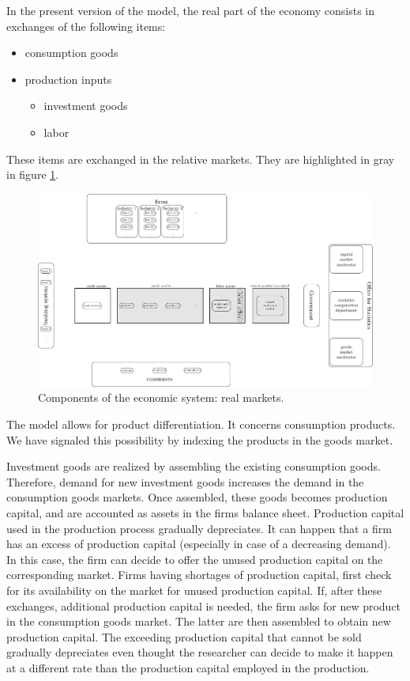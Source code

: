 \documentclass{book}
\begin{document}
In the present version of the model, the real part of the economy consists in exchanges of the following items:
\begin{itemize}
	\item consumption goods
	\item production inputs
		\begin{itemize}
			\item investment goods
			\item labor
		\end{itemize}
\end{itemize}

These items are exchanged in the relative markets. They are highlighted in gray in figure \ref{fig:componentsc2}.


\begin{figure}[htp]
\hskip-1cm\includegraphics[scale=0.5]{agents_and_interactions_figure1c2-0.pdf}
	\caption{Components of the economic system: real markets.}
	\label{fig:componentsc2}
\end{figure}

The model allows for product differentiation. It concerns consumption products. We have signaled this possibility by indexing the products in the goods market.

Investment goods are realized by assembling the existing consumption goods. Therefore, demand for new investment goods increases the demand in the consumption goods markets. Once assembled, these goods becomes production capital, and are accounted as assets in the firms balance sheet. Production capital used in the production process gradually depreciates. It can happen that a firm has an excess of production capital (especially in case of a decreasing demand). In this case, the firm can decide to offer the unused production capital on the corresponding market. 
Firms having shortages of production capital, first check for its availability on the market for unused production capital. If, after these exchanges, additional production capital is needed, the firm asks for new product in the consumption goods market. The latter are then assembled to obtain new production capital. The exceeding production capital that cannot be sold gradually depreciates even thought the researcher can decide to make it happen at a different rate than the production capital employed in the production.
\end{document}
